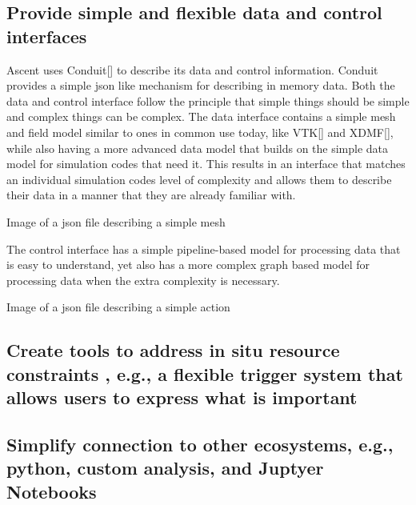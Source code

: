 \subsection{Provide simple and flexible data and control interfaces}
Ascent uses Conduit[] to describe its data and control information. Conduit
provides a simple json like mechanism for describing in memory data.
%
Both the data and control interface follow the principle that simple things
should be simple and complex things can be complex.
%
The data interface contains a simple mesh and field model similar to ones
in common use today, like VTK[] and XDMF[], while also having a more advanced
data model that builds on the simple data model for simulation codes that
need it.
%
This results in an interface that matches an individual simulation codes
level of complexity and allows them to describe their data in a manner that
they are already familiar with.
%

Image of a json file describing a simple mesh

%
The control interface has a simple pipeline-based model for processing
data that is easy to understand, yet also has a more complex graph based
model for processing data when the extra complexity is necessary.
%

Image of a json file describing a simple action

\subsection{Create tools to address in situ resource constraints , e.g., a flexible trigger system that allows users to express what is important}

\subsection{Simplify connection to other ecosystems, e.g., python, custom analysis, and Juptyer Notebooks}
